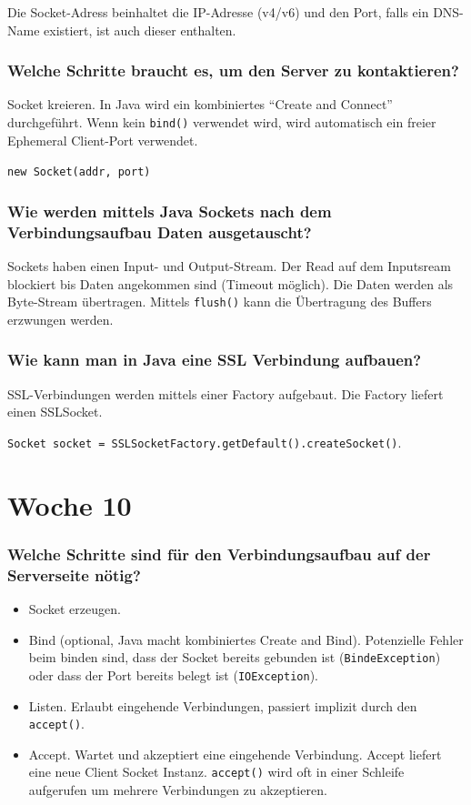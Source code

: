 \documentclass[10pt,a4paper]{scrartcl}
\begin{document}
Die Socket-Adress beinhaltet die IP-Adresse (v4/v6) und den Port, falls ein DNS-Name 
existiert, ist auch dieser enthalten.
 
\subsubsection{Welche Schritte braucht es, um den Server zu kontaktieren?}

Socket kreieren. In Java wird ein kombiniertes "`Create
and Connect"' durchgeführt. Wenn kein \texttt{bind()} verwendet wird, wird automatisch ein freier
Ephemeral Client-Port verwendet.

\texttt{new Socket(\dq addr\dq, port)}
 
\subsubsection{Wie werden mittels Java Sockets nach dem Verbindungsaufbau Daten ausgetauscht?}

Sockets haben einen Input- und Output-Stream. Der Read auf dem Inputsream blockiert bis Daten
angekommen sind (Timeout möglich). Die Daten werden als Byte-Stream übertragen. Mittels
\texttt{flush()} kann die Übertragung des Buffers erzwungen werden.
 
\subsubsection{Wie kann man in Java eine SSL Verbindung aufbauen? }

SSL-Verbindungen werden mittels einer Factory aufgebaut. Die Factory liefert einen SSLSocket.

\texttt{Socket socket = SSLSocketFactory.getDefault().createSocket()}.


\section{Woche 10}

\subsubsection{Welche Schritte sind für den Verbindungsaufbau auf der Serverseite nötig?}

\begin{itemize}
	\item Socket erzeugen.
	\item Bind (optional, Java macht kombiniertes Create and Bind). Potenzielle Fehler beim
		binden sind, dass der Socket bereits gebunden ist (\texttt{BindeException}) oder dass der Port
		bereits belegt ist (\texttt{IOException}).
	\item Listen. Erlaubt eingehende Verbindungen, passiert implizit durch den \texttt{accept()}.
	\item Accept. Wartet und akzeptiert eine eingehende Verbindung. Accept liefert eine neue Client
		Socket Instanz. \texttt{accept()} wird oft in einer Schleife aufgerufen um mehrere Verbindungen
		zu akzeptieren.
\end{itemize}
\end{document}
